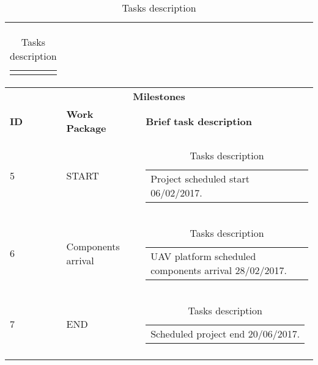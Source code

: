 \begin{longtable}[htb]{@{}lll@{}}
\begin{tabular}[c]{@{}l@{}}
\begin{minipage}[t]{0.7\linewidth}
		\end{minipage}
	\end{tabular} \\
\midrule[2pt]
\multicolumn{3}{c}{\textbf{\large Milestones} }\\ \midrule[2pt]
\textbf{ID} & \textbf{Work Package} &\textbf{Brief task description}\\ \midrule[1pt]
	5& START& \begin{tabular}[c]{@{}l@{}}
		\begin{minipage}[t]{0.7\linewidth}
			Project scheduled start 06/02/2017.
		\end{minipage}
	\end{tabular} \\
	6& Components arrival& \begin{tabular}[c]{@{}l@{}}
		\begin{minipage}[t]{0.7\linewidth}
			UAV platform scheduled components arrival 28/02/2017.
		\end{minipage}
	\end{tabular} \\
	7& END& \begin{tabular}[c]{@{}l@{}}
		\begin{minipage}[t]{0.7\linewidth}
			Scheduled project end 20/06/2017.
		\end{minipage}
	\end{tabular} \\
		\bottomrule[3pt]
	\caption{Tasks description}
\end{longtable}

\clearpage
